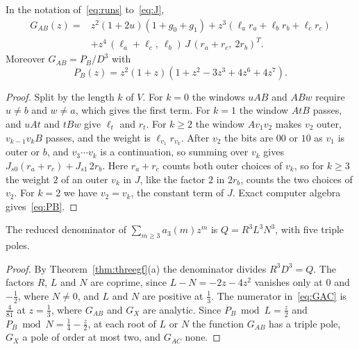 \begin{proposition}\label{prop:GAB}
In the notation of~\eqref{eq:runs} to~\eqref{eq:J},
\begin{equation}\label{eq:GAB}
\begin{aligned}
G_{AB}(z)={}&z^2(1+2u)(1+g_0+g_1)+z^3(\ell_ar_a+\ell_br_b+\ell_cr_c)\\
&+z^4\,(\ell_a+\ell_c,\ \ell_b)\,J\,(r_a+r_c,\ 2r_b)^{T}.
\end{aligned}
\end{equation}
Moreover $G_{AB}=P_B/D^3$ with
\begin{equation}\label{eq:PB}
P_B(z)=z^2(1+z)(1+z^2-3z^3+4z^6+4z^7).
\end{equation}
\end{proposition}

\begin{proof}
Split by the length $k$ of $V$. For $k=0$ the windows $uAB$ and $ABw$ require $u\ne b$ and
$w\ne a$, which gives the first term. For $k=1$ the window $AtB$ passes, and $uAt$ and $tBw$ give
$\ell_t$ and $r_t$. For $k\ge2$ the window $Av_1v_2$ makes $v_2$ outer, $v_{k-1}v_kB$ passes, and
the weight is $\ell_{v_1}r_{v_k}$. After $v_2$ the bits are $00$ or $10$ as $v_1$ is outer or $b$,
and $v_3\cdots v_k$ is a continuation, so summing over $v_k$ gives $J_{s0}(r_a+r_c)+J_{s1}\,2r_b$.
Here $r_a+r_c$ counts both outer choices of $v_k$, so for $k\ge3$ the weight $2$ of an outer
$v_k$ in $J$, like the factor $2$ in $2r_b$, counts the two choices of $v_2$. For $k=2$ we have
$v_2=v_k$, the constant term of $J$. Exact computer algebra gives~\eqref{eq:PB}.
\end{proof}

\begin{theorem}\label{thm:denominator}
The reduced denominator of $\sum_{m\ge3}a_3(m)z^m$ is $Q=R^3L^3N^3$, with five triple poles.
\end{theorem}

\begin{proof}
By Theorem~\ref{thm:threegf}(a) the denominator divides $R^3D^3=Q$. The factors $R$, $L$ and
$N$ are coprime, since $L-N=-2z-4z^2$ vanishes only at $0$ and $-\frac12$, where $N\ne0$, and
$L$ and $N$ are positive at $\frac13$. The numerator in~\eqref{eq:GAC} is $\frac4{81}$ at
$z=\frac13$, where $G_{AB}$ and $G_X$ are analytic. Since $P_B\bmod L=\frac z2$ and
$P_B\bmod N=\frac14-\frac z2$, at each root of $L$ or $N$ the function $G_{AB}$ has a triple
pole, $G_X$ a pole of order at most two, and $G_{AC}$ none.
\end{proof}
